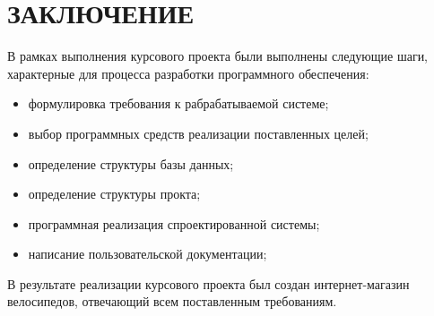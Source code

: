 \section*{ЗАКЛЮЧЕНИЕ}

В рамках выполнения курсового проекта были выполнены следующие шаги,
характерные для процесса разработки программного обеспечения:

\begin{itemize}
  \item формулировка требования к рабрабатываемой системе;
  \item выбор программных средств реализации поставленных целей;
  \item определение структуры базы данных;
  \item определение структуры прокта;
  \item программная реализация спроектированной системы;
  \item написание пользовательской документации;
\end{itemize}

В результате реализации курсового проекта был создан интернет-магазин велосипедов,
отвечающий всем поставленным требованиям.

\pagebreak
